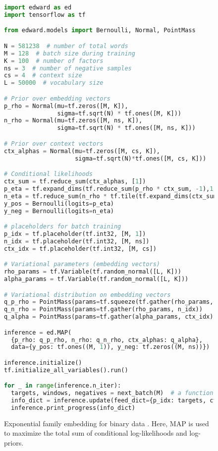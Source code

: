 \begin{figure}[!h]
\begin{lstlisting}[language=python]
import edward as ed
import tensorflow as tf

from edward.models import Bernoulli, Normal, PointMass

N = 581238  # number of total words
M = 128  # batch size during training
K = 100  # number of factors
ns = 3  # number of negative samples
cs = 4  # context size
L = 50000  # vocabulary size

# Prior over embedding vectors
p_rho = Normal(mu=tf.zeros([M, K]),
               sigma=tf.sqrt(N) * tf.ones([M, K]))
n_rho = Normal(mu=tf.zeros([M, ns, K]),
               sigma=tf.sqrt(N) * tf.ones([M, ns, K]))

# Prior over context vectors
ctx_alphas = Normal(mu=tf.zeros([M, cs, K]),
                    sigma=tf.sqrt(N)*tf.ones([M, cs, K]))

# Conditional likelihoods
ctx_sum = tf.reduce_sum(ctx_alphas, [1])
p_eta = tf.expand_dims(tf.reduce_sum(p_rho * ctx_sum, -1),1)
n_eta = tf.reduce_sum(n_rho * tf.tile(tf.expand_dims(ctx_sum, 1), [1, ns, 1]), -1)
y_pos = Bernoulli(logits=p_eta)
y_neg = Bernoulli(logits=n_eta)

# placeholders for batch training
p_idx = tf.placeholder(tf.int32, [M, 1])
n_idx = tf.placeholder(tf.int32, [M, ns])
ctx_idx = tf.placeholder(tf.int32, [M, cs])

# Variational parameters (embedding vectors)
rho_params = tf.Variable(tf.random_normal([L, K]))
alpha_params = tf.Variable(tf.random_normal([L, K]))

# Variational distribution on embedding vectors
q_p_rho = PointMass(params=tf.squeeze(tf.gather(rho_params, p_idx)))
q_n_rho = PointMass(params=tf.gather(rho_params, n_idx))
q_alpha = PointMass(params=tf.gather(alpha_params, ctx_idx))

inference = ed.MAP(
  {p_rho: q_p_rho, n_rho: q_n_rho, ctx_alphas: q_alpha},
  data={y_pos: tf.ones((M, 1)), y_neg: tf.zeros((M, ns))})

inference.initialize()
tf.initialize_all_variables().run()

for _ in range(inference.n_iter):
  targets, windows, negatives = next_batch(M)  # a function to generate data
  info_dict = inference.update(feed_dict={p_idx: targets, ctx_idx: windows, n_idx: negatives})
  inference.print_progress(info_dict)
\end{lstlisting}
\caption{Exponential family embedding for binary data \citep{rudolph2016exponential}. Here, \gls{MAP}
is used to maximize the total sum of conditional log-likelihoods and log-priors.}
\label{fig:ef_emb}
\end{figure}

